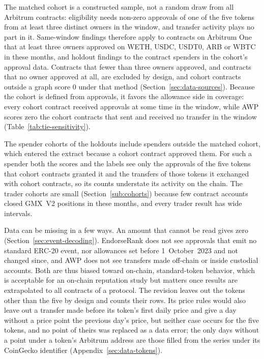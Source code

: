 
The matched cohort is a constructed sample, not a random draw from all Arbitrum contracts: eligibility needs non-zero approvals of one of the five tokens from at least three distinct owners in the window, and transfer activity plays no part in it. Same-window findings therefore apply to contracts on Arbitrum One that at least three owners approved on WETH, USDC, USDT0, ARB or WBTC in these months, and holdout findings to the contract spenders in the cohort's approval data. Contracts that fewer than three owners approved, and contracts that no owner approved at all, are excluded by design, and cohort contracts outside a graph score $0$ under that method (Section~\ref{sec:data-sources}). Because the cohort is defined from approvals, it favors the allowance side in coverage: every cohort contract received approvals at some time in the window, while AWP scores zero the cohort contracts that sent and received no transfer in the window (Table~\ref{tab:tie-sensitivity}).

The spender cohorts of the holdouts include spenders outside the matched cohort, which entered the extract because a cohort contract approved them. For such a spender both the scores and the labels see only the approvals of the five tokens that cohort contracts granted it and the transfers of those tokens it exchanged with cohort contracts, so its counts understate its activity on the chain. The trader cohorts are small (Section~\ref{sub:cohorts}) because few contract accounts closed GMX~V2 positions in these months, and every trader result has wide intervals.

Data can be missing in a few ways. An amount that cannot be read gives zero (Section~\ref{sec:event-decoding}). EndorseRank does not see approvals that emit no standard ERC-20 event, nor allowances set before 1~October~2023 and not changed since, and AWP does not see transfers made off-chain or inside custodial accounts. Both are thus biased toward on-chain, standard-token behavior, which is acceptable for an on-chain reputation study but matters once results are extrapolated to all contracts of a protocol. The revision leaves out the tokens other than the five by design and counts their rows. Its price rules would also leave out a transfer made before its token's first daily price and give a day without a price point the previous day's price, but neither case occurs for the five tokens, and no point of theirs was replaced as a data error; the only days without a point under a token's Arbitrum address are those filled from the series under its CoinGecko identifier (Appendix~\ref{sec:data-tokens}).

